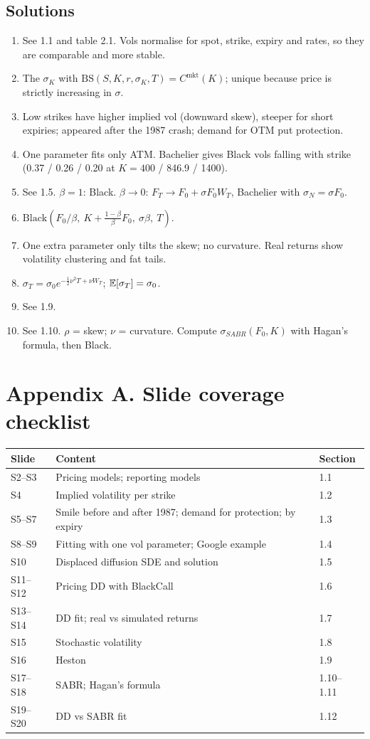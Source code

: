 \documentclass[10pt]{article}
\begin{document}
\subsection*{Solutions}
\begin{enumerate}[label=S\arabic*.]
\item See 1.1 and table 2.1. Vols normalise for spot, strike, expiry and rates, so they are comparable and more stable.
\item The $\sigma_K$ with $\mathrm{BS}(S,K,r,\sigma_K,T)=C^{\text{mkt}}(K)$; unique because price is strictly increasing in $\sigma$.
\item Low strikes have higher implied vol (downward skew), steeper for short expiries; appeared after the 1987 crash; demand for OTM put protection.
\item One parameter fits only ATM. Bachelier gives Black vols falling with strike (0.37 / 0.26 / 0.20 at $K=400$ / 846.9 / 1400).
\item See 1.5. $\beta=1$: Black. $\beta\to0$: $F_T\to F_0+\sigma F_0W_T$, Bachelier with $\sigma_N=\sigma F_0$.
\item $\mathrm{Black}(F_0/\beta,\ K+\frac{1-\beta}{\beta}F_0,\ \sigma\beta,\ T)$.
\item One extra parameter only tilts the skew; no curvature. Real returns show volatility clustering and fat tails.
\item $\sigma_T=\sigma_0e^{-\frac12\nu^2T+\nu W_T}$; $\mathbb{E}[\sigma_T]=\sigma_0$.
\item See 1.9.
\item See 1.10. $\rho$ = skew; $\nu$ = curvature. Compute $\sigma_{SABR}(F_0,K)$ with Hagan's formula, then Black.
\end{enumerate}

\section*{Appendix A. Slide coverage checklist}
{\small\begin{tabularx}{\linewidth}{@{}l X l@{}}\toprule
Slide & Content & Section\\\midrule
S2--S3 & Pricing models; reporting models & 1.1\\
S4 & Implied volatility per strike & 1.2\\
S5--S7 & Smile before and after 1987; demand for protection; by expiry & 1.3\\
S8--S9 & Fitting with one vol parameter; Google example & 1.4\\
S10 & Displaced diffusion SDE and solution & 1.5\\
S11--S12 & Pricing DD with BlackCall & 1.6\\
S13--S14 & DD fit; real vs simulated returns & 1.7\\
S15 & Stochastic volatility & 1.8\\
S16 & Heston & 1.9\\
S17--S18 & SABR; Hagan's formula & 1.10--1.11\\
S19--S20 & DD vs SABR fit & 1.12\\\bottomrule
\end{tabularx}}
\end{document}
